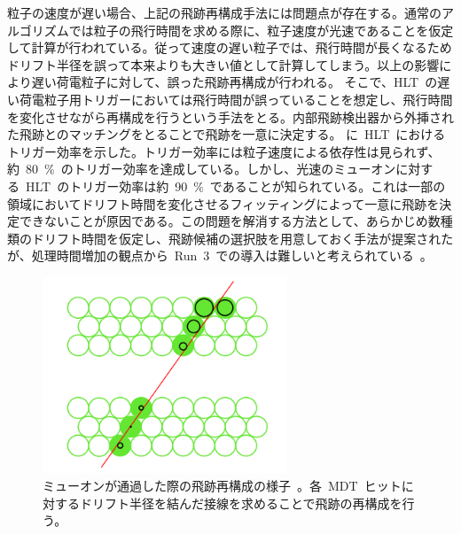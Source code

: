 粒子の速度が遅い場合、上記の飛跡再構成手法には問題点が存在する。通常のアルゴリズムでは粒子の飛行時間を求める際に、粒子速度が光速であることを仮定して計算が行われている。従って速度の遅い粒子では、飛行時間が長くなるためドリフト半径を誤って本来よりも大きい値として計算してしまう。以上の影響により遅い荷電粒子に対して、誤った飛跡再構成が行われる。
そこで、HLT~の遅い荷電粒子用トリガーにおいては飛行時間が誤っていることを想定し、飛行時間を変化させながら再構成を行うという手法をとる。内部飛跡検出器から外挿された飛跡とのマッチングをとることで飛跡を一意に決定する。
に~HLT~におけるトリガー効率を示した。トリガー効率には粒子速度による依存性は見られず、約~80~$\%$~のトリガー効率を達成している。しかし、光速のミューオンに対する~HLT~のトリガー効率は約~90~$\%$~であることが知られている。これは一部の領域においてドリフト時間を変化させるフィッティングによって一意に飛跡を決定できないことが原因である。この問題を解消する方法として、あらかじめ数種類のドリフト時間を仮定し、飛跡候補の選択肢を用意しておく手法が提案されたが、処理時間増加の観点から~Run~3~での導入は難しいと考えられている~\cite{MT:01}。

\begin{figure}[H]
        \centering   
        \includegraphics[width=0.65\textwidth,page=2]{img/pdf3/mdt.png}
        \caption[ミューオンが通過した際の飛跡再構成の様子]{ミューオンが通過した際の飛跡再構成の様子~\cite{MT:01}。各~MDT~ヒットに対するドリフト半径を結んだ接線を求めることで飛跡の再構成を行う。}
        \label{fig:mdt}
\end{figure}

